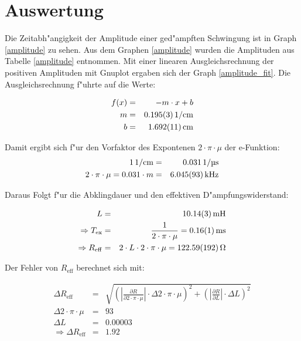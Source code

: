 \section{Auswertung}
	\label{sec:auswertung}
	

	Die Zeitabh"angigkeit der Amplitude einer ged"ampften Schwingung ist in Graph \eqref{amplitude} zu sehen.
	Aus dem Graphen \eqref{amplitude} wurden die Amplituden aus Tabelle \eqref{amplitude} entnommen. Mit einer linearen Ausgleichsrechnung der positiven Amplituden mit Gnuplot ergaben sich der Graph \eqref{amplitude_fit}. Die Ausgleichsrechnung f"uhrte auf die Werte:

	\begin{eqnarray}
		f(x) &=& -m \cdot x + b\\ \label{ausgleich}
		m &=& \SI{0.195 (3)}{1\per\centi\meter} \nonumber\\
		b &=& \SI{1.692 (11)}{\centi\meter}\nonumber 
	\end{eqnarray}

	Damit ergibt sich f"ur den Vorfaktor des Expontenen $2 \cdot \pi \cdot \mu$ der e-Funktion: 
	\begin{eqnarray*}
		\SI{1}{1\per\centi\meter} &=& \SI{0.031}{1\per\micro\second}\\
		2\cdot \pi \cdot \mu  = 0.031 \cdot m &=&  \SI{6.045 (93)}{\kilo \hertz}
	\end{eqnarray*}

	Daraus Folgt f"ur die Abklingdauer und den effektiven D"ampfungswiderstand:

	\begin{eqnarray*}
		L &=& \SI{10.14 (3)}{\milli \henry }\\
		\Rightarrow T_\mathrm{ex} &=& \frac{1}{2 \cdot \pi \cdot \mu} = \SI{0.16 (1)}{\milli \second}\\
		\Rightarrow R_\mathrm{eff} &=& 2 \cdot L \cdot 2 \cdot \pi \cdot \mu = \SI{122.59 (192)}{\ohm}
	\end{eqnarray*}

	Der Fehler von $R_\mathrm{eff}$ berechnet sich mit:

	\begin{eqnarray*}
		\Delta R_\mathrm{eff} &=& \sqrt{ \left( |\frac{\partial R}{\partial 2 \cdot \pi \cdot \mu}| \cdot \Delta 2 \cdot \pi \cdot \mu \right)^2 + \left( |\frac{\partial R}{\partial L}| \cdot \Delta L \right)^2}\\ \label{fehler}
		\Delta 2 \cdot \pi \cdot \mu &=& 93\\
		\Delta L &=& 0.00003\\
		\Rightarrow \Delta R_\mathrm{eff} &=& 1.92
	\end{eqnarray*}

